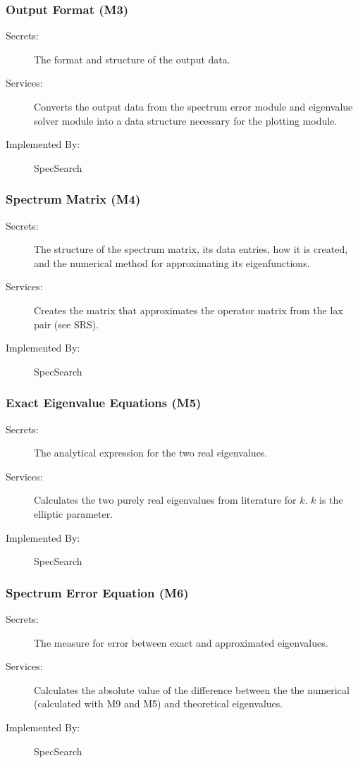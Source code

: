 \documentclass[12pt, titlepage]{article}
\begin{document}
\subsubsection{Output Format (M3)}

\begin{description}
	\item[Secrets:] The format and structure of the output data.
	\item[Services:] Converts the output data from the spectrum error module 
	and eigenvalue solver module into a data structure necessary for the 
	plotting module. 
	\item[Implemented By:] SpecSearch
\end{description}

\subsubsection{Spectrum Matrix (M4)}

\begin{description}
	\item[Secrets:]The structure of the spectrum matrix, its data entries, how 
	it is created, and the numerical method for approximating its 
	eigenfunctions. 
	\item[Services:]Creates the matrix that approximates the operator matrix 
	from the lax pair (see SRS). 
	\item[Implemented By:] SpecSearch
\end{description}

\subsubsection{Exact Eigenvalue Equations (M5)}

\begin{description}
	\item[Secrets:]The analytical expression for the two real eigenvalues. 
	\item[Services:]Calculates the two purely real eigenvalues from 
	literature for $k$. $k$ is the elliptic parameter. 
	\item[Implemented By:] SpecSearch
\end{description}

\subsubsection{Spectrum Error Equation (M6)}

\begin{description}
	\item[Secrets:] The measure for error between exact and approximated 
	eigenvalues.
	\item[Services:]Calculates the absolute value of the difference between the 
	the numerical (calculated with M9 and M5) and 
	theoretical eigenvalues.
	\item[Implemented By:] SpecSearch
\end{description} 
\end{document}
